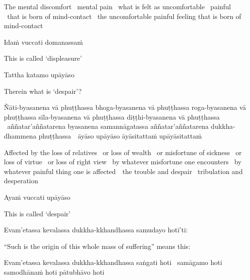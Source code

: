 \begin{english-hang-verses}
  The mental discomfort \breathmark\ mental pain \breathmark\ what is felt as uncomfortable \breathmark\ painful \breathmark\ that is born of mind-contact \breathmark\ the uncomfortable painful feeling that is born of mind-contact
\end{english-hang-verses}

Idaṁ vuccati domanassaṁ

\begin{english}
  This is called `displeasure'
\end{english}

Tattha katamo upāyāso

\begin{english}
  Therein what is `despair'?
\end{english}

\begin{pali-hang}
  Ñāti-byasanena vā phuṭṭhassa bhoga-byasanena vā phuṭṭhassa roga-byasanena vā phuṭṭhassa sīla-byasanena vā phuṭṭhassa diṭṭhi-byasanena vā phuṭṭhassa \breathmark\ aññatar'aññatarena byasanena samannāgatassa aññatar'aññatarena dukkha-dhammena \mbox{phuṭṭhassa}~\breathmark\ āyāso upāyāso āyāsitattaṁ upāyāsitattaṁ
\end{pali-hang}

\begin{english-hang-verses}
  Affected by the loss of relatives \breathmark\ or loss of wealth \breathmark\ or misfortune of sickness \breathmark\ or loss of virtue \breathmark\ or loss of right view \breathmark\ by whatever misfortune one encounters \breathmark\ by whatever painful thing one is \mbox{affected}~\breathmark\ the trouble and despair \breathmark\ tribulation and desperation
\end{english-hang-verses}

Ayaṁ vuccati upāyāso

\begin{english}
  This is called `despair'
\end{english}

\ifafiveversion\clearpage\fi

Evam'etassa kevalassa dukkha-kkhandhassa samudayo hotī'ti:

\begin{english}
  ``Such is the origin of this whole mass of suffering'' means this:
\end{english}

\begin{pali-hang}
  Evam'etassa kevalassa dukkha-kkhandhassa saṅgati hoti \breathmark\ samāgamo hoti samodhānaṁ hoti pātubhāvo hoti
\end{pali-hang}

